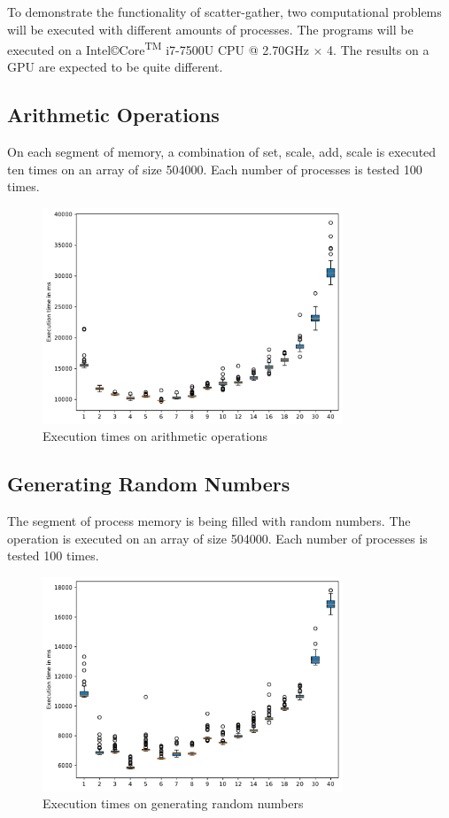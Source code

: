 \documentclass[a4paper]{article}
\begin{document}
To demonstrate the functionality of scatter-gather, two computational problems will be executed with different amounts of processes. The programs will be executed on a Intel\copyright Core\textsuperscript{TM} i7-7500U CPU @ 2.70GHz $\times$ 4. The results on a GPU are expected to be quite different.

\subsection{Arithmetic Operations}
On each segment of memory, a combination of set, scale, add, scale is executed ten times on an array of size 504000. Each number of processes is tested 100 times.

\begin{figure}[ht]
    \includegraphics[width=0.8\textwidth]{figs/dump1.pdf}
    \caption{Execution times on arithmetic operations}
    \label{fig:dump1}
\end{figure}

\subsection{Generating Random Numbers}
The segment of process memory is being filled with random numbers. The operation is executed on an array of size 504000. Each number of processes is tested 100 times.

\begin{figure}[ht]
    \includegraphics[width=0.8\textwidth]{figs/dump2.pdf}
    \caption{Execution times on generating random numbers}
    \label{fig:dump2}
\end{figure}
\end{document}
